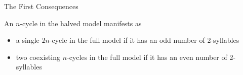 \begin{frame}{The First Consequences}
	\vspace{3em}
	\begin{theorem}
		An $n$-cycle in the halved model manifests as
		\begin{itemize}
			\item a single $2n$-cycle in the full model if it has an odd number of 2-syllables
			\item two coexisting $n$-cycles in the full model if it has an even number of 2-syllables
		\end{itemize}
	\end{theorem}
\end{frame}

